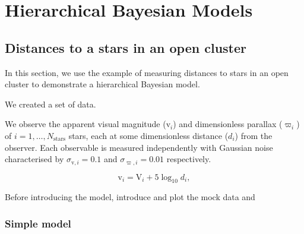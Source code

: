 %
%
%
%
%
\chapter{Hierarchical Bayesian Models}


\section[Stellar distances]{Distances to a stars in an open cluster}

\newcommand{\appmag}{\ensuremath{\mathrm{v}}}
\newcommand{\absmag}{\ensuremath{\mathrm{V}}}

In this section, we use the example of measuring distances to stars in an open cluster to demonstrate a hierarchical Bayesian model.

We created a set of data.

We observe the apparent visual magnitude (\(\appmag_i\)) and dimensionless parallax (\(\varpi_i\)) of \(i = 1,\dots,N_\mathrm{stars}\) stars, each at some dimensionless distance (\(d_i\)) from the observer. Each observable is measured independently with Gaussian noise characterised by \(\sigma_{\appmag,i} = 0.1\) and \(\sigma_{\varpi,i} = 0.01\) respectively.

%
\begin{equation}
    \appmag_i = \absmag_i + 5 \log_{10} d_i,
\end{equation}
%

Before introducing the model, introduce and plot the mock data and 

\subsection{Simple model}


